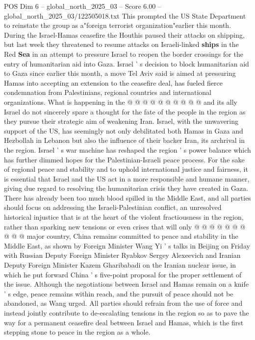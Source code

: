 \begin{textsample}{POS Dim 6 – global\_north\_2025\_03 – Score 6.00 – global\_north\_2025\_03/122505018.txt}
This prompted the US State Department to reinstate the group as a"foreign terrorist organization"earlier this month.
During the Israel-Hamas ceasefire the Houthis paused their attacks on shipping, but last week they threatened to resume attacks on Israeli-linked \textbf{ships} in the Red \textbf{Sea} in an attempt to pressure Israel to reopen the border crossings for the entry of humanitarian aid into Gaza.
Israel ' s decision to block humanitarian aid to Gaza since earlier this month, a move Tel Aviv said is aimed at pressuring Hamas into accepting an extension to the ceasefire deal, has fueled fierce condemnation from Palestinians, regional countries and international organizations.
What is happening in the @ @ @ @ @ @ @ @ @ @ and its ally Israel do not sincerely spare a thought for the fate of the people in the region as they pursue their strategic aim of weakening Iran.
Israel, with the unwavering support of the US, has seemingly not only debilitated both Hamas in Gaza and Hezbollah in Lebanon but also the influence of their backer Iran, its archrival in the region.
Israel ' s war machine has reshaped the region ' s power balance which has further dimmed hopes for the Palestinian-Israeli peace process.
For the sake of regional peace and stability and to uphold international justice and fairness, it is essential that Israel and the US act in a more responsible and humane manner, giving due regard to resolving the humanitarian crisis they have created in Gaza.
There has already been too much blood spilled in the Middle East, and all parties should focus on addressing the Israeli-Palestinian conflict, an unresolved historical injustice that is at the heart of the violent fractiousness in the region, rather than sparking new tensions or even crises that will only @ @ @ @ @ @ @ @ @ @ major country, China remains committed to peace and stability in the Middle East, as shown by Foreign Minister Wang Yi ' s talks in Beijing on Friday with Russian Deputy Foreign Minister Ryabkov Sergey Alexeevich and Iranian Deputy Foreign Minister Kazem Gharibabadi on the Iranian nuclear issue, in which he put forward China ' s five-point proposal for the proper settlement of the issue.
Although the negotiations between Israel and Hamas remain on a knife ' s edge, peace remains within reach, and the pursuit of peace should not be abandoned, as Wang urged.
All parties should refrain from the use of force and instead jointly contribute to de-escalating tensions in the region so as to pave the way for a permanent ceasefire deal between Israel and Hamas, which is the first stepping stone to peace in the region as a whole.

\end{textsample}
